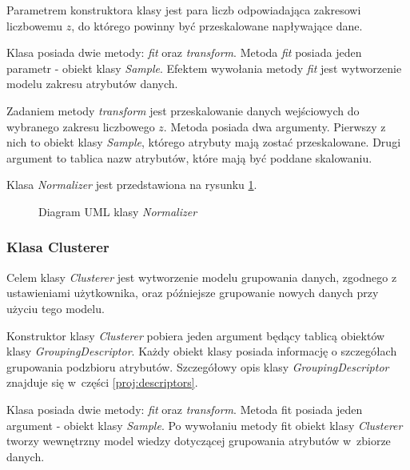 \documentclass[../thesis.tex]{subfiles}
\begin{document}
Parametrem konstruktora klasy jest para liczb odpowiadająca zakresowi liczbowemu $z$, do którego powinny być przeskalowane napływające dane.

Klasa posiada dwie metody: \emph{fit} oraz \emph{transform}. Metoda \emph{fit} posiada jeden parametr - obiekt klasy \emph{Sample}. Efektem wywołania metody \emph{fit} jest wytworzenie modelu zakresu atrybutów danych. 

Zadaniem metody \emph{transform} jest przeskalowanie danych wejściowych do wybranego zakresu liczbowego $z$. Metoda posiada dwa argumenty. Pierwszy z nich to obiekt klasy \emph{Sample}, którego atrybuty mają zostać przeskalowane. Drugi argument to tablica nazw atrybutów, które mają być poddane skalowaniu.

Klasa \emph{Normalizer} jest przedstawiona na rysunku \ref{proj:diagram_normalizer}.

\begin{figure}[h]
\centering
{}
\caption{Diagram UML klasy \emph{Normalizer}}
\label{proj:diagram_normalizer}
\end{figure}

\subsubsection{Klasa Clusterer}

Celem klasy \emph{Clusterer} jest wytworzenie modelu grupowania danych, zgodnego z ustawieniami użytkownika, oraz późniejsze grupowanie nowych danych przy użyciu tego modelu. 

Konstruktor klasy \emph{Clusterer} pobiera jeden argument będący tablicą obiektów klasy \emph{GroupingDescriptor}. Każdy obiekt klasy posiada informację o szczegółach grupowania podzbioru atrybutów. Szczegółowy opis klasy \emph{GroupingDescriptor} znajduje się w~części \ref{proj:descriptors}.

Klasa posiada dwie metody: \emph{fit} oraz \emph{transform}. Metoda fit posiada jeden argument - obiekt klasy \emph{Sample}. Po wywołaniu metody fit obiekt klasy \emph{Clusterer} tworzy wewnętrzny model wiedzy dotyczącej grupowania atrybutów w~zbiorze danych.
\end{document}
